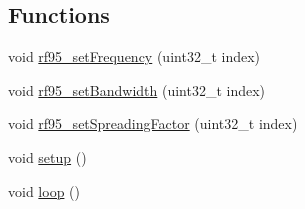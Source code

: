 \subsection*{Functions}
\begin{DoxyCompactItemize}
\item 
void \hyperlink{Uno__Serial__LoRa__Sniffer_8ino_a3bb8f066b00f812ee5e2829024ec9e92}{rf95\-\_\-set\-Frequency} (uint32\-\_\-t index)
\item 
void \hyperlink{Uno__Serial__LoRa__Sniffer_8ino_a3c1c24188350866381dafdbe21edf627}{rf95\-\_\-set\-Bandwidth} (uint32\-\_\-t index)
\item 
void \hyperlink{Uno__Serial__LoRa__Sniffer_8ino_a55c1e7e148f07d943c9843ef02009cd2}{rf95\-\_\-set\-Spreading\-Factor} (uint32\-\_\-t index)
\item 
void \hyperlink{Uno__Serial__LoRa__Sniffer_8ino_a4fc01d736fe50cf5b977f755b675f11d}{setup} ()
\item 
void \hyperlink{Uno__Serial__LoRa__Sniffer_8ino_afe461d27b9c48d5921c00d521181f12f}{loop} ()
\end{DoxyCompactItemize}
